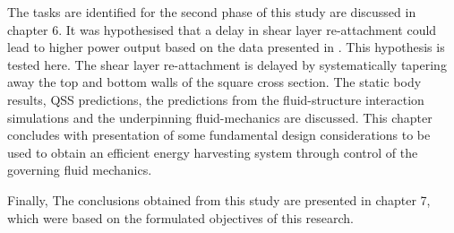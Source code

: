 The tasks are identified for the second phase of this study are discussed in chapter 6. It was hypothesised that a delay in shear layer re-attachment could lead to higher power output based on the data presented in \citet{Luo1994}. This hypothesis is tested here. The shear layer re-attachment is delayed by systematically tapering away the top and bottom walls of the square cross section. The static body results, QSS predictions, the predictions from the fluid-structure interaction simulations and the underpinning fluid-mechanics are discussed. This chapter concludes with presentation of some fundamental design considerations to be used to obtain an efficient energy harvesting system through control of the governing fluid mechanics.

Finally, The conclusions obtained from this study are presented in chapter 7, which were based on the formulated objectives of this research.  

      









